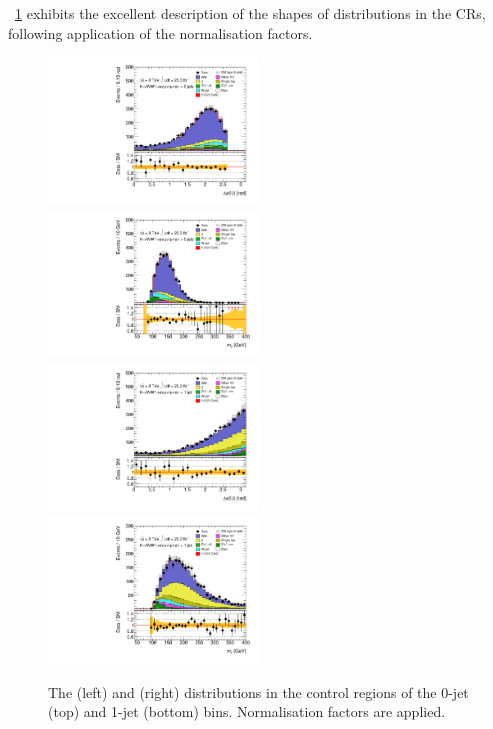 \Figure~\ref{fig:ww_bkg:cr_plots} exhibits the excellent description of the shapes of 
distributions in the CRs, following application of the normalisation factors.

\begin{figure}[t]
	\includegraphics[width=0.495\textwidth]{tex/ww/emme_CutWWControl_0jet_DPhill_mh125_lin}
	\hfill
	\includegraphics[width=0.495\textwidth]{tex/ww/emme_CutWWControl_0jet_MT_TrackHWW_Clj_mh125_lin}
	\\
	\includegraphics[width=0.495\textwidth]{tex/ww/emme_CutWWControl_1jet_DPhill_mh125_lin}
	\hfill
	\includegraphics[width=0.495\textwidth]{tex/ww/emme_CutWWControl_1jet_MT_TrackHWW_Clj_mh125_lin}
	\caption{The \dphill (left) and \mt (right) distributions in the \WW control regions 
	of the 0-jet (top) and 1-jet (bottom) bins. Normalisation factors are applied.}
	\label{fig:ww_bkg:cr_plots}
\end{figure}



